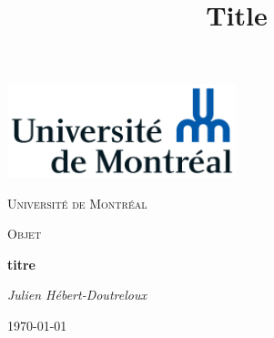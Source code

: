 \documentclass[french, babel]{article}
\title{Title}
\begin{document}
\begin{titlepage}
	\centering
	\includegraphics[width=0.5\textwidth]{Universite_de_Montreal_logo}\par\vspace{1cm}
	{\scshape\LARGE Université de Montréal\par}
	\vspace{1cm}
	{\scshape\Large Objet\par}
	\vspace{1.5cm}
	{\huge\bfseries titre \par}
	\vspace{2cm}
	{\Large\itshape Julien Hébert-Doutreloux\par}
	\vfill
	\vfill
	{\large \today\par}
\end{titlepage}
\end{document}
